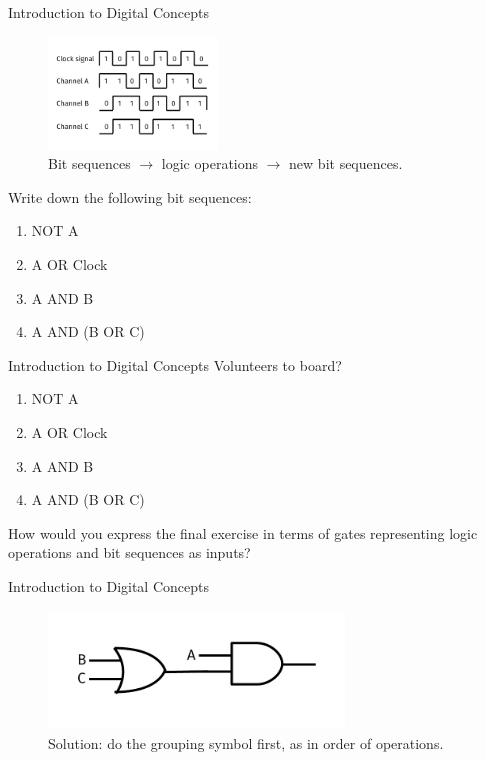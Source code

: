 \documentclass{beamer}
\begin{document}
\begin{frame}{Introduction to Digital Concepts}
\small
\begin{figure}
\centering
\includegraphics[width=0.4\textwidth]{figures/BitSequence2.pdf}
\caption{\label{fig:bitsequence3} Bit sequences $\rightarrow$ logic operations $\rightarrow$ new bit sequences.}
\end{figure}
Write down the following bit sequences:
\begin{enumerate}
\item NOT A
\item A OR Clock
\item A AND B
\item A AND (B OR C)
\end{enumerate}
\end{frame}

\begin{frame}{Introduction to Digital Concepts}
\small
Volunteers to board?
\begin{enumerate}
\item NOT A
\item A OR Clock
\item A AND B
\item A AND (B OR C)
\end{enumerate}
How would you express the final exercise in terms of gates representing logic operations and bit sequences as inputs?
\end{frame}

\begin{frame}{Introduction to Digital Concepts}
\small
\begin{figure}
\centering
\includegraphics[width=0.7\textwidth]{figures/Operators2.pdf}
\caption{\label{fig:bitsequence4} Solution: do the grouping symbol first, as in order of operations.}
\end{figure}
\end{frame}
\end{document}

